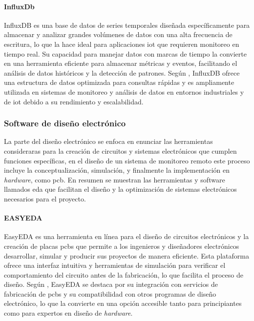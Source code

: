 \paragraph{InfluxDb}
InfluxDB es una base de datos de series temporales diseñada específicamente para almacenar y analizar grandes volúmenes de datos con una alta frecuencia de escritura, lo que la hace ideal para aplicaciones \acrshort{iot} que requieren monitoreo en tiempo real. Su capacidad para manejar datos con marcas de tiempo la convierte en una herramienta eficiente para almacenar métricas y eventos, facilitando el análisis de datos históricos y la detección de patrones. Según \cite{jovanovic2018influxdb}, InfluxDB ofrece una estructura de datos optimizada para consultas rápidas y es ampliamente utilizada en sistemas de monitoreo y análisis de datos en entornos industriales y de \acrshort{iot} debido a su rendimiento y escalabilidad.

\subsubsection{Software de diseño electrónico}
La parte del diseño electrónico se enfoca en enunciar las herramientas consideraras para la creación de circuitos y sistemas electrónicos que cumplen funciones específicas, en el diseño de un sistema de monitoreo remoto este proceso incluye la conceptualización, simulación, y finalmente la implementación en \textit{hardware}, como \acrfull{pcb}. En resumen se muestran las herramientas y software llamados \acrfull{eda} que facilitan el diseño y la optimización de sistemas electrónicos necesarios para el proyecto.

\paragraph{EASYEDA}

EasyEDA es una herramienta en línea para el diseño de circuitos electrónicos y la creación de placas \acrshort{pcb}s que permite a los ingenieros y diseñadores electrónicos desarrollar, simular y producir sus proyectos de manera eficiente. Esta plataforma ofrece una interfaz intuitiva y herramientas de simulación para verificar el comportamiento del circuito antes de la fabricación, lo que facilita el proceso de diseño. Según \cite{leung2020easyeda}, EasyEDA se destaca por su integración con servicios de fabricación de \acrshort{pcb}s y su compatibilidad con otros programas de diseño electrónico, lo que la convierte en una opción accesible tanto para principiantes como para expertos en diseño de \textit{hardware}.

